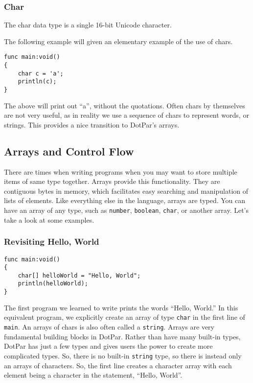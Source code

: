 \subsubsection{Char}
The char data type is a single 16-bit Unicode character. 

The following example will given an elementary example of the use of chars.

\begin{verbatim}
func main:void()
{
    char c = 'a';
    println(c);
}
\end{verbatim}

The above will print out ``a'', without the quotations. Often chars by themselves are not very useful, as in reality we use a sequence of chars to represent words, or strings.  This provides a nice transition to DotPar's arrays.

\subsection{Arrays and Control Flow}
There are times when writing programs when you may want to store multiple items of same type together. Arrays provide this functionality. They are contiguous bytes in memory, which facilitates easy searching and manipulation of lists of elements. Like everything else in the language, arrays are typed. You can have an array of any type, such as \verb=number=, \verb=boolean=, \verb=char=, or another array. Let's take a look at some examples.

\subsubsection{Revisiting Hello, World}

\begin{verbatim}
func main:void()
{
    char[] helloWorld = "Hello, World";
    println(helloWorld);
}
\end{verbatim}

The first program we learned to write prints the words ``Hello, World.''  In this equivalent program, we explicitly create an array of type \verb=char= in the first line of \verb=main=. An arrays of chars is also often called a \verb=string=. Arrays are very fundamental building blocks in DotPar. Rather than have many built-in types, DotPar has just a few types and gives users the power to create more complicated types. So, there is no built-in \verb=string= type, so there is instead only an arrays of characters. So, the first line creates a character array with each element being a character in the statement, ``Hello, World''.

